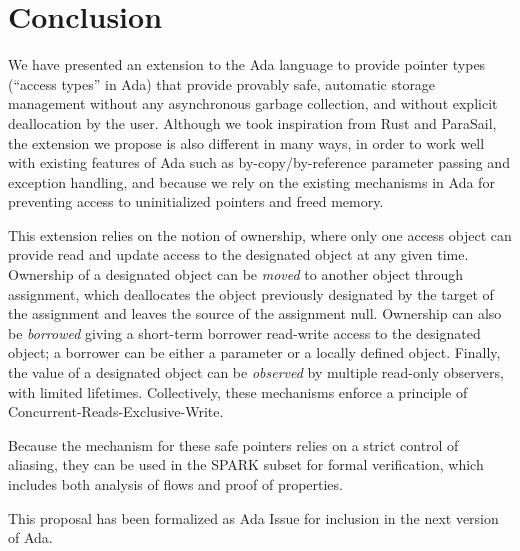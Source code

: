 \documentclass{llncs}
\begin{document}
\section{Conclusion}
We have presented an extension to the Ada language to provide pointer types (``access types'' in Ada) that provide provably safe, automatic
storage management without any asynchronous garbage collection, and without explicit deallocation by the user. Although we took inspiration
from Rust and ParaSail, the extension we propose is also different in many ways, in order to work well with existing features of Ada such
as by-copy/by-reference parameter passing and exception handling, and because we rely on the existing mechanisms in Ada for preventing access
to uninitialized pointers and freed memory. 

This extension relies on the notion of ownership, where only one access object can provide read and update access to the designated object at any given time.
Ownership of a designated object can be \textit{moved} to another object through assignment, which deallocates the object previously designated
by the target of the assignment and leaves the source of the assignment null. Ownership can also be \textit{borrowed} giving a short-term borrower read-write access to the designated object; a borrower
can be either a parameter or a locally defined object. Finally, the value of a designated object can be \textit{observed} by multiple
read-only observers, with limited lifetimes. Collectively, these mechanisms enforce a principle of Concurrent-Reads-Exclusive-Write.

Because the mechanism for these safe pointers relies on a strict control of aliasing, they can be used in the SPARK subset for formal verification, which
includes both analysis of flows and proof of properties. 

This proposal has been formalized as Ada Issue \cite{AI2018} for inclusion in the next version of Ada.

\printbibliography[title={References}]
\end{document}
